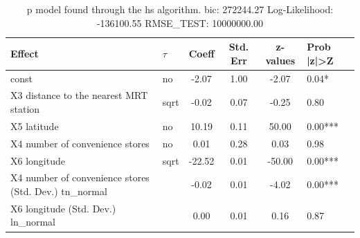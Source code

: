 \begin{table}
	\caption{p model found through the hs algorithm. bic: 272244.27 Log-Likelihood: -136100.55 RMSE_TEST: 10000000.00}
	\begin{center}
		\begin{tabular}{|l|l|c|c|c|l|}
			\hline
			Effect & $\tau$ & Coeff & Std. Err & z-values & Prob |z|>Z \\
			\hline
			const & no & -2.07 & 1.00 & -2.07 & 0.04* \\
			\hline
			X3 distance to the nearest MRT station & sqrt & -0.02 & 0.07 & -0.25 & 0.80 \\
			\hline
			X5 latitude & no & 10.19 & 0.11 & 50.00 & 0.00*** \\
			\hline
			X4 number of convenience stores & no & 0.01 & 0.28 & 0.03 & 0.98 \\
			\hline
			X6 longitude & sqrt & -22.52 & 0.01 & -50.00 & 0.00*** \\
			\hline
			X4 number of convenience stores (Std. Dev.) tn_normal &  & -0.02 & 0.01 & -4.02 & 0.00*** \\
			\hline
			X6 longitude (Std. Dev.) ln_normal &  & 0.00 & 0.01 & 0.16 & 0.87 \\
			\hline
		\end{tabular}
	\end{center}
\end{table}